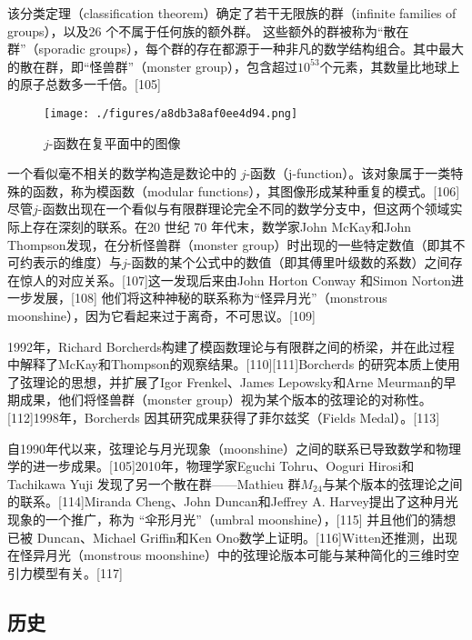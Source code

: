 该分类定理（classification theorem）确定了若干无限族的群（infinite families of groups），以及26 个不属于任何族的额外群。 这些额外的群被称为“散在群”（sporadic groups），每个群的存在都源于一种非凡的数学结构组合。其中最大的散在群，即“怪兽群”（monster group），包含超过\(10^{53}\)个元素，其数量比地球上的原子总数多一千倍。[105]
\begin{figure}[ht]
\centering
\texttt{[image: ./figures/a8db3a8af0ee4d94.png]}
\caption{\( j \)-函数在复平面中的图像} \label{fig_String_13}
\end{figure}
一个看似毫不相关的数学构造是数论中的 \( j \)-函数（j-function）。该对象属于一类特殊的函数，称为模函数（modular functions），其图像形成某种重复的模式。[106]尽管\( j \)-函数出现在一个看似与有限群理论完全不同的数学分支中，但这两个领域实际上存在深刻的联系。在20 世纪 70 年代末，数学家John McKay和John Thompson发现，在分析怪兽群（monster group）时出现的一些特定数值（即其不可约表示的维度）与\( j \)-函数的某个公式中的数值（即其傅里叶级数的系数）之间存在惊人的对应关系。[107]这一发现后来由John Horton Conway 和Simon Norton进一步发展，[108] 他们将这种神秘的联系称为“怪异月光”（monstrous moonshine），因为它看起来过于离奇，不可思议。[109]

1992年，Richard Borcherds构建了模函数理论与有限群之间的桥梁，并在此过程中解释了McKay和Thompson的观察结果。[110][111]Borcherds 的研究本质上使用了弦理论的思想，并扩展了Igor Frenkel、James Lepowsky和Arne Meurman的早期成果，他们将怪兽群（monster group）视为某个版本的弦理论的对称性。[112]1998年，Borcherds 因其研究成果获得了菲尔兹奖（Fields Medal）。[113]

自1990年代以来，弦理论与月光现象（moonshine）之间的联系已导致数学和物理学的进一步成果。[105]2010年，物理学家Eguchi Tohru、Ooguri Hirosi和Tachikawa Yuji 发现了另一个散在群——Mathieu 群\(M_{24}\)与某个版本的弦理论之间的联系。[114]Miranda Cheng、John Duncan和Jeffrey A. Harvey提出了这种月光现象的一个推广，称为 “伞形月光”（umbral moonshine），[115] 并且他们的猜想已被 Duncan、Michael Griffin和Ken Ono数学上证明。[116]Witten还推测，出现在怪异月光（monstrous moonshine）中的弦理论版本可能与某种简化的三维时空引力模型有关。[117]
\subsection{历史}  
